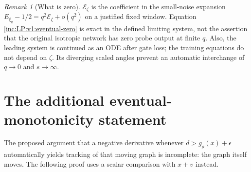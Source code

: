 \documentclass[11pt]{article}
\numberwithin{equation}{section}
\theoremstyle{remark}\newtheorem{remark}[theorem]{Remark}
\begin{document}
\begin{remark}[What is zero]
$\mathcal E_\zeta$ is the coefficient in the small-noise expansion
$E_{\xi_q}-1/2=q^2\mathcal E_\zeta+o(q^2)$ on a justified fixed window.
Equation \eqref{inc:LP:v1:eventual-zero} is exact in the defined limiting
system, not the assertion that the original isotropic network has zero
probe output at finite $q$. Also, the leading system is continued as an
ODE after gate loss; the training equations do not depend on $\zeta$.
Its diverging scaled angles prevent an automatic interchange of $q\to0$
and $s\to\infty$.
\end{remark}

\section{The additional eventual-monotonicity statement}
\label{inc:LP:v1:monotonic}
The proposed argument that a negative derivative whenever
$d>g_\rho(x)+\epsilon$ automatically yields tracking of that moving graph
is incomplete: the graph itself moves. The following proof uses a scalar
comparison with $x+v$ instead.
\end{document}
